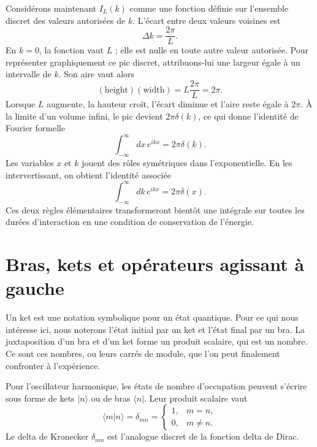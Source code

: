 Considérons maintenant \(I_L(k)\) comme une fonction définie sur l’ensemble discret des valeurs autorisées de \(k\). L’écart entre deux valeurs voisines est
\begin{equation}
\Delta k=\frac{2\pi}{L}.
\end{equation}
En \(k=0\), la fonction vaut \(L\) ; elle est nulle en toute autre valeur autorisée. Pour représenter graphiquement ce pic discret, attribuons-lui une largeur égale à un intervalle de \(k\). Son aire vaut alors
\begin{equation}
(\text{height})(\text{width})
=L\frac{2\pi}{L}=2\pi.
\end{equation}
Lorsque \(L\) augmente, la hauteur croît, l’écart diminue et l’aire reste égale à \(2\pi\). À la limite d’un volume infini, le pic devient \(2\pi\delta(k)\), ce qui donne l’identité de Fourier formelle
\begin{equation}
\int_{-\infty}^{\infty}dx\,e^{ikx}=2\pi\delta(k).
\end{equation}
Les variables \(x\) et \(k\) jouent des rôles symétriques dans l’exponentielle. En les intervertissant, on obtient l’identité associée
\begin{equation}
\int_{-\infty}^{\infty}dk\,e^{ikx}=2\pi\delta(x).
\end{equation}
Ces deux règles élémentaires transformeront bientôt une intégrale sur toutes les durées d’interaction en une condition de conservation de l’énergie.

\section{Bras, kets et opérateurs agissant à gauche}

Un ket est une notation symbolique pour un état quantique. Pour ce qui nous intéresse ici, nous noterons l’état initial par un ket et l’état final par un bra. La juxtaposition d’un bra et d’un ket forme un produit scalaire, qui est un nombre. Ce sont ces nombres, ou leurs carrés de module, que l’on peut finalement confronter à l’expérience.

\begin{classroomqa}\end{classroomqa}

Pour l’oscillateur harmonique, les états de nombre d’occupation peuvent s’écrire sous forme de kets \(\lvert n\rangle\) ou de bras \(\langle n\rvert\). Leur produit scalaire vaut
\begin{equation}
\langle m\vert n\rangle=\delta_{mn}
=\begin{cases}
1,&m=n,\\
0,&m\neq n.
\end{cases}
\end{equation}
Le delta de Kronecker \(\delta_{mn}\) est l’analogue discret de la fonction delta de Dirac.

